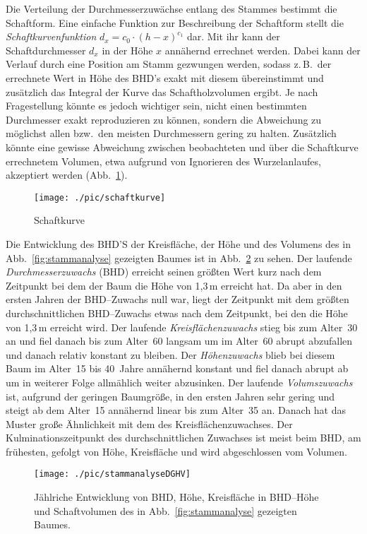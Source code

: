 \documentclass[twocolumn]{scrartcl}
\begin{document}
Die Verteilung der Durchmesserzuwächse entlang des Stammes bestimmt die
Schaftform. Eine einfache Funktion zur Beschreibung der Schaftform stellt die
\emph{Schaftkurvenfunktion} $d_x = c_0 \cdot (h - x)^{c_1}$
dar. Mit ihr kann der Schaftdurchmesser $d_x$ in der Höhe $x$ annähernd
errechnet werden. Dabei kann der Verlauf durch eine Position am Stamm gezwungen
werden, sodass z.\,B.\ der errechnete Wert in Höhe des BHD's exakt mit diesem
übereinstimmt und zusätzlich das Integral der Kurve das Schaftholzvolumen
ergibt. Je nach Fragestellung könnte es jedoch wichtiger sein, nicht einen
bestimmten Durchmesser exakt reproduzieren zu können, sondern die Abweichung zu
möglichst allen bzw.\ den meisten Durchmessern gering zu halten. Zusätzlich
könnte eine gewisse Abweichung zwischen beobachteten und über die Schaftkurve
errechnetem Volumen, etwa aufgrund von Ignorieren des Wurzelanlaufes, akzeptiert
werden (Abb.~\ref{fig:schaftkurve}).

\begin{figure}[htbp]
  \centering
  \texttt{[image: ./pic/schaftkurve]}
  \caption{Schaftkurve}
  \label{fig:schaftkurve}
\end{figure}

Die Entwicklung des BHD'S der Kreisfläche, der Höhe und des Volumens des in
Abb.~\ref{fig:stammanalyse} gezeigten Baumes ist in
Abb.~\ref{fig:stammanalyseDGHV} zu sehen. Der laufende \emph{Durchmesserzuwachs}
(BHD) erreicht seinen größten Wert kurz nach dem Zeitpunkt bei dem der Baum die
Höhe von 1,3\,m erreicht hat. Da aber in den ersten Jahren der BHD--Zuwachs null
war, liegt der Zeitpunkt mit dem größten durchschnittlichen BHD--Zuwachs etwas
nach dem Zeitpunkt, bei den die Höhe von 1,3\,m erreicht wird. Der laufende
\emph{Kreisflächenzuwachs} stieg bis zum Alter~30 an und fiel danach bis zum
Alter~60 langsam um im Alter~60 abrupt abzufallen und danach relativ konstant zu
bleiben. Der \emph{Höhenzuwachs} blieb bei diesem Baum im Alter~15 bis 40~Jahre
annähernd konstant und fiel danach abrupt ab um in weiterer Folge allmählich
weiter abzusinken. Der laufende \emph{Volumszuwachs} ist, aufgrund der geringen
Baumgröße, in den ersten Jahren sehr gering und steigt ab dem Alter~15 annähernd
linear bis zum Alter~35 an. Danach hat das Muster große Ähnlichkeit mit dem des
Kreisflächenzuwachses. Der Kulminationszeitpunkt des durchschnittlichen
Zuwachses ist meist beim BHD, am frühesten, gefolgt von Höhe, Kreisfläche und
wird abgeschlossen vom Volumen.

\begin{figure}[htbp]
  \centering
  \texttt{[image: ./pic/stammanalyseDGHV]}
  \caption{Jählriche Entwicklung von BHD, Höhe, Kreisfläche in BHD--Höhe und
  Schaftvolumen des in Abb.~\ref{fig:stammanalyse} gezeigten Baumes.}
  \label{fig:stammanalyseDGHV}
\end{figure}
\end{document}
